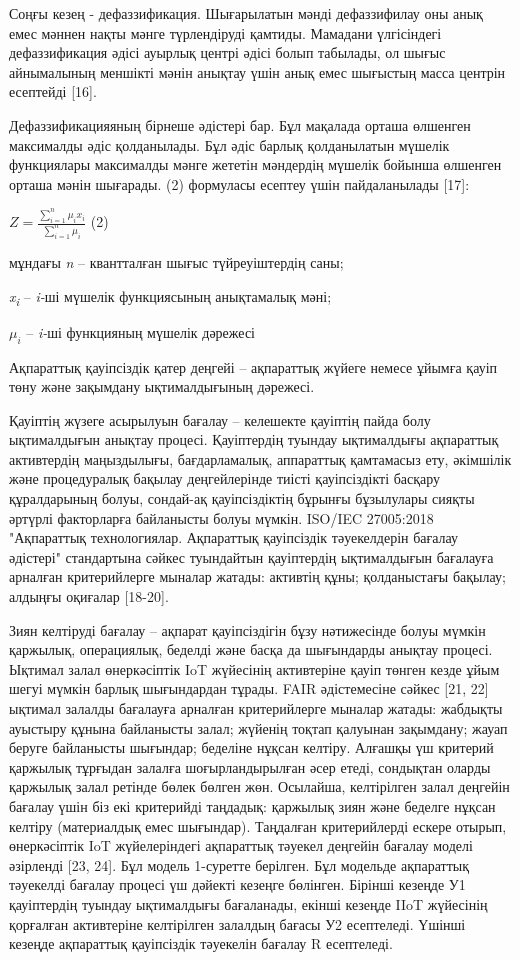 Соңғы кезең - дефаззификация. Шығарылатын мәнді дефаззифилау оны анық
емес мәннен нақты мәнге түрлендіруді қамтиды. Мамадани үлгісіндегі
дефаззификация әдісі ауырлық центрі әдісі болып табылады, ол шығыс
айнымалының меншікті мәнін анықтау үшін анық емес шығыстың масса центрін
есептейді {[}16{]}.

Дефаззификацияяның бірнеше әдістері бар. Бұл мақалада орташа өлшенген
максималды әдіс қолданылады. Бұл әдіс барлық қолданылатын мүшелік
функциялары максималды мәнге жететін мәндердің мүшелік бойынша өлшенген
орташа мәнін шығарады. (2) формуласы есептеу үшін пайдаланылады
{[}17{]}:

\(Z = \frac{\sum_{i = 1}^{n}{\mu_{i}x_{i}}}{\sum_{i = 1}^{n}\mu_{i}}\)
(2)

мұндағы \emph{n} -- квантталған шығыс түйреуіштердің саны;

\emph{x\textsubscript{i}} -- \emph{i-}ші мүшелік функциясының
анықтамалық мәні;

\(\mu_{i}\) -- \emph{i-}ші функцияның мүшелік дәрежесі

Ақпараттық қауіпсіздік қатер деңгейі -- ақпараттық жүйеге немесе ұйымға
қауіп төну және зақымдану ықтималдығының дәрежесі.

Қауіптің жүзеге асырылуын бағалау -- келешекте қауіптің пайда болу
ықтималдығын анықтау процесі. Қауіптердің туындау ықтималдығы ақпараттық
активтердің маңыздылығы, бағдарламалық, аппараттық қамтамасыз ету,
әкімшілік және процедуралық бақылау деңгейлерінде тиісті қауіпсіздікті
басқару құралдарының болуы, сондай-ақ қауіпсіздіктің бұрынғы бұзылулары
сияқты әртүрлі факторларға байланысты болуы мүмкін. ISO/IEC 27005:2018
"Ақпараттық технологиялар. Ақпараттық қауіпсіздік тәуекелдерін бағалау
әдістері" стандартына сәйкес туындайтын қауіптердің ықтималдығын
бағалауға арналған критерийлерге мыналар жатады: активтің құны;
қолданыстағы бақылау; алдыңғы оқиғалар {[}18-20{]}.

Зиян келтіруді бағалау -- ақпарат қауіпсіздігін бұзу нәтижесінде болуы
мүмкін қаржылық, операциялық, беделді және басқа да шығындарды анықтау
процесі. Ықтимал залал өнеркәсіптік IoT жүйесінің активтеріне қауіп
төнген кезде ұйым шегуі мүмкін барлық шығындардан тұрады. FAIR
әдістемесіне сәйкес {[}21, 22{]} ықтимал залалды бағалауға арналған
критерийлерге мыналар жатады: жабдықты ауыстыру құнына байланысты залал;
жүйенің тоқтап қалуынан зақымдану; жауап беруге байланысты шығындар;
беделіне нұқсан келтіру. Алғашқы үш критерий қаржылық тұрғыдан залалға
шоғырландырылған әсер етеді, сондықтан оларды қаржылық залал ретінде
бөлек бөлген жөн. Осылайша, келтірілген залал деңгейін бағалау үшін біз
екі критерийді таңдадық: қаржылық зиян және беделге нұқсан келтіру
(материалдық емес шығындар). Таңдалған критерийлерді ескере отырып,
өнеркәсіптік IoT жүйелеріндегі ақпараттық тәуекел деңгейін бағалау
моделі әзірленді {[}23, 24{]}. Бұл модель 1-суретте берілген. Бұл
модельде ақпараттық тәуекелді бағалау процесі үш дәйекті кезеңге
бөлінген. Бірінші кезеңде У1 қауіптердің туындау ықтималдығы бағаланады,
екінші кезеңде IIoT жүйесінің қорғалған активтеріне келтірілген залалдың
бағасы У2 есептеледі. Үшінші кезеңде ақпараттық қауіпсіздік тәуекелін
бағалау R есептеледі.

